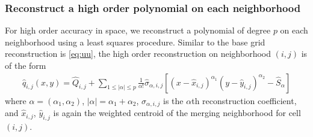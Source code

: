 \subsubsection*{Reconstruct a high order polynomial on each neighborhood}
For high order accuracy in space, we reconstruct a polynomial of degree $p$ on each neighborhood using a least squares procedure.  Similar to the base grid reconstruction is \eqref{eq:uu}, the high order reconstruction on neighborhood $(i,j)$ is of the form
\begin{equation}\label{eq:q}
\begin{aligned}
    \widehat q_{i,j} (x,y) = \widehat{Q}_{i,j} +  \sum_{1 \leq |\alpha| \leq p}  \frac{1}{\alpha!} \widehat \sigma_{\alpha,i,j} [(x-\widehat x_{i,j})^{\alpha_1}(y-\widehat y_{i,j})^{\alpha_2}-\widehat S_{\alpha}]
\end{aligned}
\end{equation}
where $\alpha = (\alpha_1, \alpha_2)$, $|\alpha| = \alpha_1 + \alpha_2$, $\sigma_{\alpha,i,j}$ is the $\alpha$th reconstruction coefficient,
and $\widehat x_{i,j}$, $\widehat y_{i,j}$ is again the weighted centroid of the merging neighborhood for cell $(i,j)$. 
